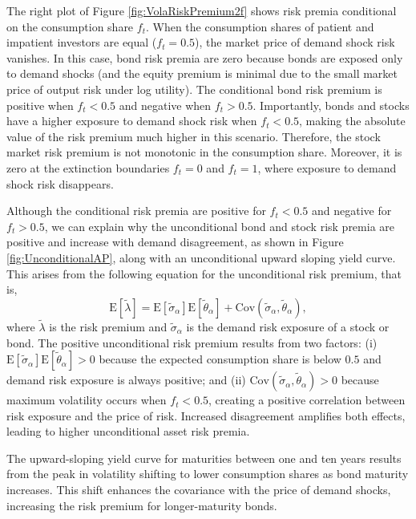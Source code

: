 \documentclass[preprint,11pt,authoryear]{elsarticle}
\theoremstyle{plain}
\begin{document}
The right plot of Figure \ref{fig:VolaRiskPremium2f} shows risk premia conditional on the consumption share \( f_t \). When the consumption shares of patient and impatient investors are equal (\( f_t = 0.5 \)), the market price of demand shock risk vanishes. In this case, bond risk premia are zero because bonds are exposed only to demand shocks (and the equity premium is minimal due to the small market price of output risk under log utility). The conditional bond risk premium is positive when \( f_t < 0.5 \) and negative when \( f_t > 0.5 \). Importantly, bonds and stocks have a higher exposure to demand shock risk when \( f_t < 0.5 \), making the absolute value of the risk premium much higher in this scenario. Therefore, the stock market risk premium is not monotonic in the consumption share. Moreover, it is zero at the extinction boundaries \( f_t = 0 \) and \( f_t = 1 \), where exposure to demand shock risk disappears.

Although the conditional risk premia are positive for \( f_t < 0.5 \) and negative for \( f_t > 0.5 \), we can explain why the unconditional bond and stock risk premia are positive and increase with demand disagreement, as shown in Figure \ref{fig:UnconditionalAP}, along with an unconditional upward sloping yield curve. This arises from the following equation for the unconditional risk premium, that is, 
\[
\mathrm{E} \left[ \tilde{\lambda} \right] = \mathrm{E} \left[ \tilde{\sigma}_{\alpha} \right] \mathrm{E} \left[ \tilde{\theta}_{\alpha} \right] + \mathrm{Cov} \left( \tilde{\sigma}_{\alpha}, \tilde{\theta}_{\alpha} \right),
\]
where \( \tilde{\lambda} \) is the risk premium and \( \tilde{\sigma}_{\alpha} \) is the demand risk exposure of a stock or bond. The positive unconditional risk premium results from two factors: (i) \(\mathrm{E} \left[ \tilde{\sigma}_{\alpha} \right] \mathrm{E} \left[ \tilde{\theta}_{\alpha} \right] > 0\) because the expected consumption share is below \( 0.5 \) and demand risk exposure is always positive; and (ii) \(\mathrm{Cov} \left( \tilde{\sigma}_{\alpha}, \tilde{\theta}_{\alpha} \right) > 0\) because maximum volatility occurs when \( f_t < 0.5 \), creating a positive correlation between risk exposure and the price of risk. Increased disagreement amplifies both effects, leading to higher unconditional asset risk premia.

The upward-sloping yield curve for maturities between one and ten years results from the peak in volatility shifting to lower consumption shares as bond maturity increases. This shift enhances the covariance with the price of demand shocks, increasing the risk premium for longer-maturity bonds.
\end{document}
